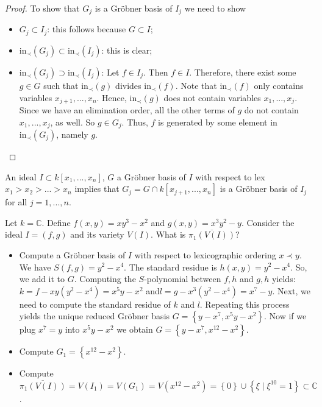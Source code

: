 \begin{proof}
  To show that \( G_j \) is a Gröbner basis of \( I_j \) we need to show 
  \begin{itemize}
    \item \( G_j \subset I_j \): this follows because \( G \subset I \);
    \item \(  \mathrm{in}_\prec(G_j) \subset \mathrm{in}_\prec (I_j) \): this is clear;
    \item \(  \mathrm{in}_\prec(G_j) \supset \mathrm{in}_\prec (I_j) \): Let \( f \in I_j \). Then \( f \in I \). Therefore, there exist some \( g \in G \) such that \( \mathrm{in}_\prec(g)  \) divides \( \mathrm{in}_\prec(f) \). Note that \( \mathrm{in}_\prec(f) \) only contains variables \( x_{j+1}, ..., x_n \). Hence, \( \mathrm{in}_\prec(g) \) does not contain variables \( x_1, ..., x_j \). Since we have an elimination order, all the other terms of \( g \) do not contain \( x_1, ..., x_j \), as well. So \( g \in G_j \). Thus, \( f \) is generated by some element in \( \mathrm{in}_\prec(G_j) \), namely \( g \).
  \end{itemize}
\end{proof}

\begin{cor}
An ideal \( I \subset k [x_1,...,x_n] \), \( G \) a Gröbner basis of \( I \) with respect to lex \( x_1 > x_2 > ... > x_n \) implies that \( G_j = G \cap k[x_{j+1}, ..., x_n] \) is a Gröbner basis of \( I_j \)  for all \( j = 1 , ... , n \).
\end{cor}

\begin{eg}
  Let \( k = \mathbb{C} \).
  Define \( f(x,y) = xy^3 - x^2 \) and \( g(x,y) = x^3y^2 - y \). Consider the ideal \( I = (f,g) \) and its variety \( V(I) \). What is \( \overline{\pi_1(V(I))} \)?

  \begin{itemize}
    \item Compute a Gröbner basis of \( I \) with respect to lexicographic ordering \( x \prec y \). We have  \( S(f,g) = y^2 - x^4 \). The standard residue is \( h (x,y) = y^2 - x^4 \). So, we add it to \( G \). Computing the \( S \)-polynomial between \( f,h \) and \( g,h \) yields: \( k = f - xy(y^2 - x^4) = x^5y - x^2 \) and\( l = g - x^3(y^2 - x^4) = x^7 - y \). Next, we need to compute the standard residue of \( k \) and \( l \). Repeating this process yields the unique reduced Gröbner basis \( G = \left\{ y - x^7, x^5y - x^2 \right\} \). Now if we plug \( x^7 = y \) into \( x^5y - x^2 \) we obtain \( G = \left\{ y - x^7, x^{12} - x^2 \right\} \).
    \item Compute \( G_1 = \left\{ x^{12} - x^2 \right\} \).
    \item Compute \( \overline{\pi_1(V(I))} = V(I_1) = V(G_1) = V(x^{12} - x^2) = \left\{ 0 \right\} \cup \left\{ \xi \mid \xi^{10} = 1 \right\} \subset \mathbb{C}\).
  \end{itemize}
\end{eg}

